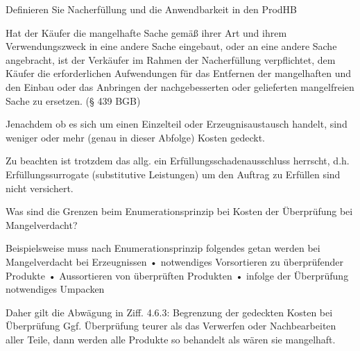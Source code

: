 Definieren Sie Nacherfüllung und die Anwendbarkeit in den ProdHB

Hat der Käufer die mangelhafte Sache gemäß ihrer Art und ihrem
Verwendungszweck in eine andere Sache eingebaut, oder an eine
andere Sache angebracht, ist der Verkäufer im Rahmen der
Nacherfüllung verpflichtet, dem Käufer die erforderlichen
Aufwendungen für das Entfernen der mangelhaften und den Einbau
oder das Anbringen der nachgebesserten oder gelieferten
mangelfreien Sache zu ersetzen.
(§ 439 BGB)

Jenachdem ob es sich um einen Einzelteil oder Erzeugnisaustausch handelt, sind weniger oder mehr
(genau in dieser Abfolge) Kosten gedeckt. 

Zu beachten ist trotzdem das allg. ein Erfüllungsschadenausschluss herrscht, d.h. Erfüllungssurrogate (substitutive Leistungen)
um den Auftrag zu Erfüllen sind nicht versichert.


Was sind die Grenzen beim Enumerationsprinzip bei Kosten der Überprüfung bei Mangelverdacht?

Beispielsweise muss nach Enumerationsprinzip folgendes getan werden bei Mangelverdacht bei Erzeugnissen
• notwendiges Vorsortieren zu
überprüfender Produkte
• Aussortieren von überprüften
Produkten
• infolge der Überprüfung
notwendiges Umpacken

Daher gilt die Abwägung in Ziff. 4.6.3: Begrenzung der gedeckten Kosten bei Überprüfung
Ggf. Überprüfung teurer als das Verwerfen oder Nachbearbeiten aller Teile, dann werden alle Produkte
so behandelt als wären sie mangelhaft.
